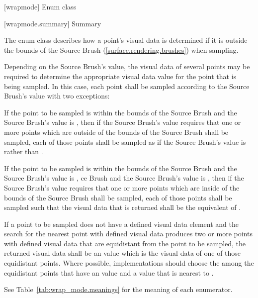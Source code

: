  [wrapmode] {Enum class }

 [wrapmode.summary] { Summary}

\pnum
The  enum class describes how a point's visual data is 
determined if it is outside the bounds of the Source Brush (\ref{surface.rendering.brushes}) when sampling.

\pnum
Depending on the Source Brush's  value, the visual data of several points may be required to determine the appropriate visual data value for the point that is being sampled. In this case, each point shall be sampled according to the Source Brush's  value with two exceptions:
\begin{enumeratea}
\item If the point to be sampled is within the bounds of the Source Brush and the Source Brush's  value is , then if the Source Brush's  value requires that one or more points which are outside of the bounds of the Source Brush shall be sampled, each of those points shall be sampled as if the Source Brush's  value is  rather than .
\item If the point to be sampled is within the bounds of the Source Brush and the Source Brush's  value is , ce Brush and the Source Brush's  value is , then if the Source Brush's  value requires that one or more points which are inside of the bounds of the Source Brush shall be sampled, each of those points shall be sampled such that the visual data that is returned shall be the equivalent of .
\end{enumeratea}

\pnum
If a point to be sampled does not have a defined visual data element and the search for the nearest point with defined visual data produces two or more points with defined visual data that are equidistant from the point to be sampled, the returned visual data shall be an \unspecnorm value which is the visual data of one of those equidistant points. Where possible, implementations should choose the among the equidistant points that have an \xaxis value and a \yaxis value that is nearest to .

\pnum
See Table~\ref{tab:wrap_mode.meanings} for the meaning of each  enumerator.

